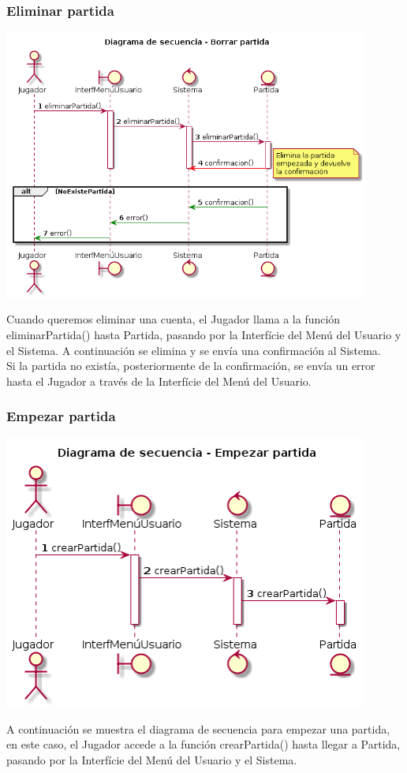 \subsubsection{Eliminar partida}
\begin{center}
  \includegraphics[width=0.9\textwidth]{./imatges/jugador/Eliminar_partida.png}
  \end{center}
  Cuando queremos eliminar una cuenta, el Jugador llama a la función eliminarPartida() hasta Partida, pasando por la Interfície del Menú del Usuario y el Sistema. A continuación se elimina y se envía una confirmación al Sistema.
  \\Si la partida no existía, posteriormente de la confirmación, se envía un error hasta el Jugador a través de la Interfície del Menú del Usuario.
 
\subsubsection{Empezar partida}
\begin{center}
  \includegraphics[width=0.9\textwidth]{./imatges/jugador/Empezar_partida.png}
  \end{center}
  A continuación se muestra el diagrama de secuencia para empezar una partida, en este caso, el Jugador accede a la función crearPartida() hasta llegar a Partida, pasando por la Interfície del Menú del Usuario y el Sistema.
  
